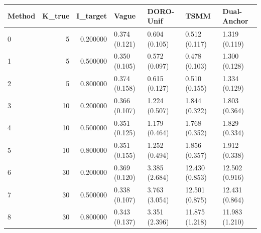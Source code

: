 \begin{tabular}{lrrllll}
\toprule
Method & K_true & I_target & Vague & DORO-Unif & TSMM & Dual-Anchor \\
\midrule
0 & 5 & 0.200000 & 0.374 (0.121) & 0.604 (0.105) & 0.512 (0.117) & 1.319 (0.119) \\
1 & 5 & 0.500000 & 0.350 (0.105) & 0.572 (0.097) & 0.478 (0.103) & 1.300 (0.128) \\
2 & 5 & 0.800000 & 0.374 (0.158) & 0.615 (0.127) & 0.510 (0.155) & 1.334 (0.129) \\
3 & 10 & 0.200000 & 0.366 (0.107) & 1.224 (0.507) & 1.844 (0.322) & 1.803 (0.364) \\
4 & 10 & 0.500000 & 0.351 (0.125) & 1.179 (0.464) & 1.768 (0.352) & 1.829 (0.334) \\
5 & 10 & 0.800000 & 0.351 (0.155) & 1.252 (0.494) & 1.856 (0.357) & 1.912 (0.338) \\
6 & 30 & 0.200000 & 0.369 (0.120) & 3.385 (2.684) & 12.430 (0.853) & 12.502 (0.916) \\
7 & 30 & 0.500000 & 0.338 (0.107) & 3.763 (3.054) & 12.501 (0.875) & 12.431 (0.864) \\
8 & 30 & 0.800000 & 0.343 (0.137) & 3.351 (2.396) & 11.875 (1.218) & 11.983 (1.210) \\
\bottomrule
\end{tabular}

